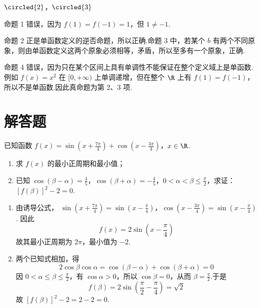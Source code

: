\begin{answer}
\(\circled{2}\)，\(\circled{3}\)
\end{answer}

\begin{solution}
命题 1 错误，因为 \(f(1)=f(-1)=1\)，但 \(1\neq-1\).

命题 2 正是单函数定义的逆否命题，所以正确.命题 3 中，若某个 \(b\) 有两个不同原象，则由单函数定义这两个原象必须相等，矛盾，所以至多有一个原象，正确.

命题 4 错误，因为只在某个区间上具有单调性不能保证在整个定义域上是单函数.例如 \(f(x)=x^2\) 在 \([0,+\infty)\) 上单调递增，但在整个 \(\R\) 上有 \(f(1)=f(-1)\)，所以不是单函数.因此真命题为第 2、3 项.
\end{solution}

\section{解答题}

\begin{problem}
已知函数 \(f(x) = \sin \left( x + \frac{7\pi}{4} \right) + \cos \left( x - \frac{3\pi}{4} \right)\)，\(x \in \R\).
\begin{enumerate}
\item 求 \( f(x) \) 的最小正周期和最小值；
\item 已知 \(\cos(\beta-\alpha)=\frac{4}{5}\)，\(\cos(\beta+\alpha)=-\frac{4}{5}\)，\(0 < \alpha < \beta \leqslant \frac{\pi}{2}\)，求证： \(\left[f(\beta)\right]^2 - 2 = 0\).
\end{enumerate}
\end{problem}

\begin{solution}
\begin{enumerate}
\item 由诱导公式，
\(\sin\left(x+\frac{7\pi}{4}\right)=\sin\left(x-\frac{\pi}{4}\right)\)，\(\cos\left(x-\frac{3\pi}{4}\right)=\sin\left(x-\frac{\pi}{4}\right)\).
因此
\[
f(x)=2\sin\left(x-\frac{\pi}{4}\right)
\]
故其最小正周期为 \(2\pi\)，最小值为 \(-2\).

\item 两个已知式相加，得
\[
2\cos\beta\cos\alpha=\cos(\beta-\alpha)+\cos(\beta+\alpha)=0
\]
因 \(0<\alpha\leqslant\beta\leqslant\frac\pi2\)，有 \(\cos\alpha>0\)，所以 \(\cos\beta=0\)，从而 \(\beta=\frac\pi2\).于是
\[
f(\beta)=2\sin\left(\frac\pi2-\frac\pi4\right)=\sqrt2
\]
故 \(\left[f(\beta)\right]^2-2=2-2=0\).
\end{enumerate}
\end{solution}

